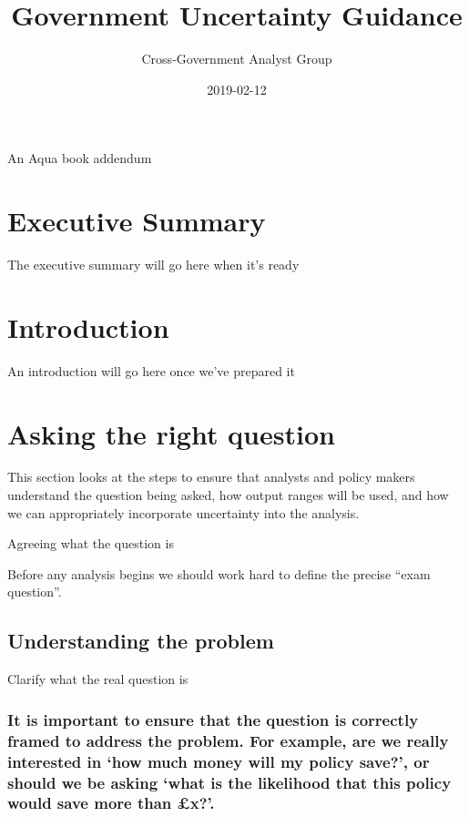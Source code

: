 \documentclass[]{book}
\title{Government Uncertainty Guidance}
\author{Cross-Government Analyst Group}
\date{2019-02-12}
\begin{document}
\maketitle

{
\setcounter{tocdepth}{1}
\tableofcontents
}
An Aqua book addendum

\chapter*{Executive Summary}\label{executive-summary}

The executive summary will go here when it's ready

\chapter*{Introduction}\label{introduction}

An introduction will go here once we've prepared it

\chapter{Asking the right question}\label{asking-the-right-question}

 This section looks at the steps to ensure that analysts and policy
makers understand the question being asked, how output ranges will be
used, and how we can appropriately incorporate uncertainty into the
analysis.

Agreeing what the question is

 Before any analysis begins we should work hard to define the precise
``exam question''.

\section{Understanding the problem}\label{understanding-the-problem}

 Clarify what the real question is

\subsection{\texorpdfstring{It is important to ensure that the question
is correctly framed to address the problem. For example, are we really
interested in `how much money will my policy save?', or should we be
asking `what is the likelihood that this policy would save more than
£x?'.}{It is important to ensure that the question is correctly framed to address the problem. For example, are we really interested in how much money will my policy save?, or should we be asking what is the likelihood that this policy would save more than £x?.}}\label{it-is-important-to-ensure-that-the-question-is-correctly-framed-to-address-the-problem.-for-example-are-we-really-interested-in-how-much-money-will-my-policy-save-or-should-we-be-asking-what-is-the-likelihood-that-this-policy-would-save-more-than-x.}
\end{document}
